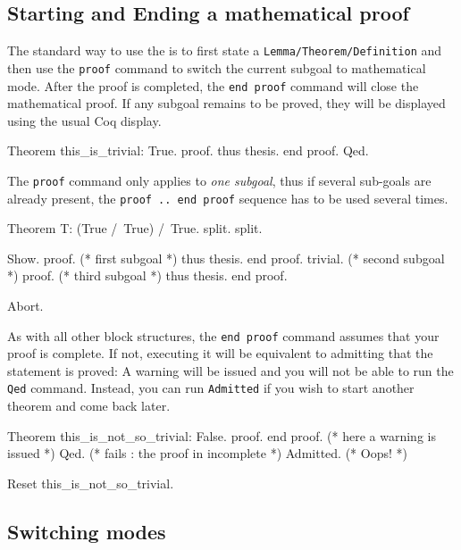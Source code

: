 \subsection{Starting and Ending a mathematical proof}

 The standard way to use the \DPL is to first state a {\texttt{Lemma/Theorem/Definition}} and then use the {\texttt{proof}} command to switch the current subgoal to mathematical mode.  After the proof is completed, the {\texttt{end proof}} command will close the mathematical proof. If any subgoal remains to be proved, they will be displayed using the usual Coq display.

\begin{coq_example}
Theorem this_is_trivial: True.
proof.
  thus thesis.
end proof.
Qed.
\end{coq_example}

The {\texttt{proof}} command only applies to \emph{one subgoal}, thus
if several sub-goals are already present, the {\texttt{proof .. end
    proof}} sequence has to be used several times.

\begin{coq_eval}
Theorem T: (True /\ True) /\ True.
  split. split.
\end{coq_eval}
\begin{coq_example}
  Show.
  proof. (* first subgoal *)
    thus thesis.
  end proof.
  trivial. (* second subgoal *)
  proof. (* third subgoal *)
    thus thesis.
  end proof.
\end{coq_example}
\begin{coq_eval}
Abort.
\end{coq_eval}

As with all other block structures, the {\texttt{end proof}} command
assumes that your proof is complete. If not, executing it will be
equivalent to admitting that the statement is proved: A warning will
be issued and you will not be able to run the {\texttt{Qed}}
command. Instead, you can run {\texttt{Admitted}} if you wish to start
another theorem and come back
later.

\begin{coq_example}
Theorem this_is_not_so_trivial: False.
proof.
end proof. (* here a warning is issued *)
Qed. (* fails : the proof in incomplete *)
Admitted. (* Oops! *)
\end{coq_example}
\begin{coq_eval}
Reset this_is_not_so_trivial.   
\end{coq_eval}

\subsection{Switching modes}

